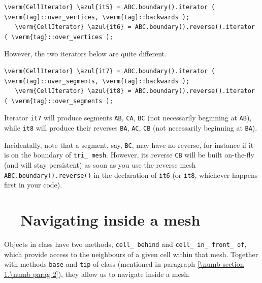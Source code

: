 \begin{Verbatim}[commandchars=\\\{\},formatcom=\small\tt,
   baselinestretch=0.94,framesep=2mm                      ]
   \verm{CellIterator} \azul{it5} = ABC.boundary().iterator ( \verm{tag}::over_vertices, \verm{tag}::backwards );
   \verm{CellIterator} \azul{it6} = ABC.boundary().reverse().iterator ( \verm{tag}::over_vertices );
\end{Verbatim}

However, the two iterators below are quite different.

\begin{Verbatim}[commandchars=\\\{\},formatcom=\small\tt,
   baselinestretch=0.94,framesep=2mm                      ]
   \verm{CellIterator} \azul{it7} = ABC.boundary().iterator ( \verm{tag}::over_segments, \verm{tag}::backwards );
   \verm{CellIterator} \azul{it8} = ABC.boundary().reverse().iterator ( \verm{tag}::over_segments );
\end{Verbatim}

Iterator {\small\tt it7} will produce segments {\small\tt AB}, {\small\tt CA}, {\small\tt BC}
(not necessarily beginning at {\small\tt AB}), while {\small\tt it8} will produce their reverses
{\small\tt BA}, {\small\tt AC}, {\small\tt CB} (not necessarily beginning at {\small\tt BA}).

Incidentally, note that a segment, say, {\small\tt BC}, may have no reverse,
for instance if it is on the boundary of {\small\tt tri\_\,mesh}.
However, its reverse {\small\tt CB} will be built on-the-fly (and will stay persistent)
as soon as you use the reverse mesh {\small\tt ABC.boundary().reverse()} in the declaration of
{\small\tt it6} (or {\small\tt it8}, whichever happens first in your code).


\section{~~Navigating inside a mesh}\label{\numb section 9.\numb parag 6}

Objects in class {\small\tt {}} have two methods, {\small\tt cell\_\,behind} and
{\small\tt cell\_\,in\_\,front\_\,of},
which provide access to the neighbours of a given cell within that mesh.
Together with methods {\small\tt base} and {\small\tt tip} of class {\small\tt {}}
(mentioned in paragraph \ref{\numb section 1.\numb parag 2}), they allow us to navigate inside
a mesh.


